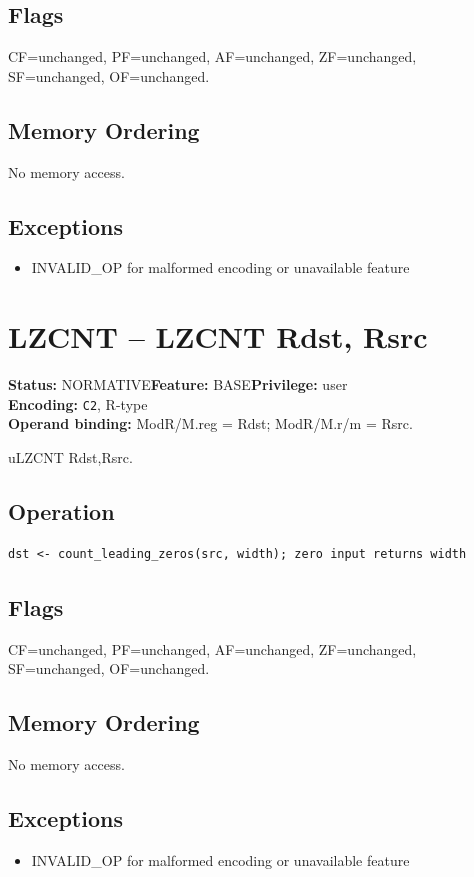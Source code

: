 \documentclass[10pt]{article}
\begin{document}
\subsection*{Flags}
CF=unchanged, PF=unchanged, AF=unchanged, ZF=unchanged, SF=unchanged, OF=unchanged.
\subsection*{Memory Ordering}
No memory access.
\subsection*{Exceptions}
\begin{itemize}
\item INVALID\_OP for malformed encoding or unavailable feature
\end{itemize}
\clearpage

\section{LZCNT -- LZCNT Rdst, Rsrc}
\textbf{Status:} NORMATIVE\quad \textbf{Feature:} BASE\quad \textbf{Privilege:} user\\
\textbf{Encoding:} \texttt{C2}, R-type\\
\textbf{Operand binding:} ModR/M.reg = Rdst; ModR/M.r/m = Rsrc.

uLZCNT Rdst,Rsrc.

\subsection*{Operation}
\begin{lstlisting}
dst <- count_leading_zeros(src, width); zero input returns width
\end{lstlisting}
\subsection*{Flags}
CF=unchanged, PF=unchanged, AF=unchanged, ZF=unchanged, SF=unchanged, OF=unchanged.
\subsection*{Memory Ordering}
No memory access.
\subsection*{Exceptions}
\begin{itemize}
\item INVALID\_OP for malformed encoding or unavailable feature
\end{itemize}
\clearpage
\end{document}
